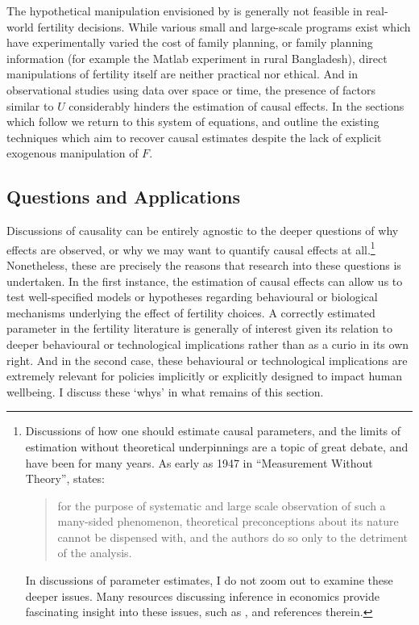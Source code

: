 \documentclass{article}
\begin{document}
\begin{spacing}{1.4}
The hypothetical manipulation envisioned by \citeauthor{Haavelmo1943} is 
generally not feasible in real-world fertility decisions. While various small
and large-scale programs exist which have experimentally varied the cost of
family planning, or family planning information (for example the Matlab
experiment in rural Bangladesh), direct manipulations of fertility itself are 
neither practical nor ethical.  And in observational
studies using data over space or time, the presence of factors similar to $U$
considerably hinders the estimation of causal effects.  In the sections which
follow we return to this system of equations, and outline the existing 
techniques which aim to recover causal estimates despite the lack of explicit 
exogenous manipulation of $F$.

\subsection{Questions and Applications}
Discussions of causality can be entirely agnostic to the deeper questions of
why effects are observed, or why we may want to quantify causal effects at 
all.\footnote{Discussions of how one should estimate causal parameters, and 
the limits of estimation without theoretical underpinnings are a topic of great 
debate, and have been for many years. As early as 1947 in ``Measurement Without 
Theory'', \citeauthor{Koopmans1947} states: 
\begin{quote}
for the purpose of systematic and large scale observation of such a many-sided 
phenomenon, theoretical preconceptions about its nature cannot be dispensed with, 
and the authors do so only to the detriment of the analysis.
\end{quote}
In discussions of parameter estimates, I do not zoom out to examine these
deeper issues.  Many resources discussing inference in economics provide 
fascinating insight into these issues, such as \citet{Keane2010}, 
\citet{Wolpin2013} and references therein.}  Nonetheless, these are precisely 
the reasons that research into these questions is undertaken.  In the first 
instance, the estimation of causal effects can allow us to test well-specified 
models or hypotheses regarding behavioural or biological mechanisms underlying
the effect of fertility choices. A correctly estimated parameter in the 
fertility literature is generally of interest given its relation to deeper 
behavioural or technological implications rather than as a curio in its own 
right.  And in the second case, these behavioural or technological implications 
are extremely relevant for policies implicitly or explicitly designed to impact 
human wellbeing.  I discuss these `whys' in what remains of this section.


\end{spacing}
\end{document}
